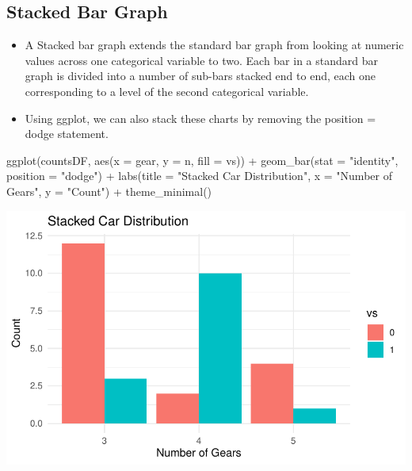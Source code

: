 \documentclass[
  letterpaper,
  DIV=11,
  numbers=noendperiod]{scrreprt}
\newenvironment{Shaded}{\begin{snugshade}}{\end{snugshade}}
\newcommand{\AttributeTok}[1]{\textcolor[rgb]{0.40,0.45,0.13}{#1}}
\newcommand{\FunctionTok}[1]{\textcolor[rgb]{0.28,0.35,0.67}{#1}}
\newcommand{\NormalTok}[1]{\textcolor[rgb]{0.00,0.23,0.31}{#1}}
\newcommand{\SpecialCharTok}[1]{\textcolor[rgb]{0.37,0.37,0.37}{#1}}
\newcommand{\StringTok}[1]{\textcolor[rgb]{0.13,0.47,0.30}{#1}}
\providecommand{\tightlist}{%
  \setlength{\itemsep}{0pt}\setlength{\parskip}{0pt}}\usepackage{longtable,booktabs,array}
\begin{document}
\subsection{Stacked Bar Graph}\label{stacked-bar-graph}

\begin{itemize}
\tightlist
\item
  A Stacked bar graph extends the standard bar graph from looking at
  numeric values across one categorical variable to two. Each bar in a
  standard bar graph is divided into a number of sub-bars stacked end to
  end, each one corresponding to a level of the second categorical
  variable.
\item
  Using ggplot, we can also stack these charts by removing the position
  = dodge statement.
\end{itemize}

\begin{Shaded}
\begin{Highlighting}[]
\FunctionTok{ggplot}\NormalTok{(countsDF, }\FunctionTok{aes}\NormalTok{(}\AttributeTok{x =}\NormalTok{ gear, }\AttributeTok{y =}\NormalTok{ n, }\AttributeTok{fill =}\NormalTok{ vs)) }\SpecialCharTok{+}
  \FunctionTok{geom\_bar}\NormalTok{(}\AttributeTok{stat =} \StringTok{"identity"}\NormalTok{, }\AttributeTok{position =} \StringTok{"dodge"}\NormalTok{) }\SpecialCharTok{+}
  \FunctionTok{labs}\NormalTok{(}\AttributeTok{title =} \StringTok{"Stacked Car Distribution"}\NormalTok{,}
       \AttributeTok{x =} \StringTok{"Number of Gears"}\NormalTok{,}
       \AttributeTok{y =} \StringTok{"Count"}\NormalTok{) }\SpecialCharTok{+}
  \FunctionTok{theme\_minimal}\NormalTok{()}
\end{Highlighting}
\end{Shaded}

\includegraphics{dataviz_files/figure-pdf/unnamed-chunk-37-1.pdf}
\end{document}
